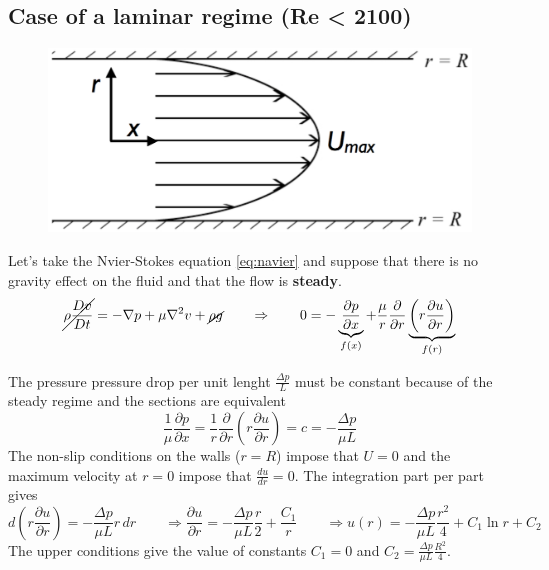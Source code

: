 	\subsection{Case of a laminar regime (Re < 2100)}
		\begin{figure}
		\vspace{-15mm}
		\includegraphics[scale=0.25]{ch2/6}
		\end{figure}
		Let's take the Nvier-Stokes equation \autoref{eq:navier} and suppose that there is no gravity effect on the fluid and that the flow is \textbf{steady}. 
		\begin{equation}
			\cancel{\rho \frac{Dv}{Dt}} = -\nabla p + \mu \nabla ^2 v + \cancel{\rho g} 
			\qquad \Rightarrow \qquad 
			0 = -\underbrace{\frac{\partial p}{\partial x}}_{f(x)} + \frac{\mu }{r} \frac{\partial}{\partial r} \underbrace{\left( r\frac{\partial u}{\partial r}\right)}_{f(r)}
		\end{equation}

		The pressure pressure drop per unit lenght $\frac{\Delta p}{L}$ must be constant because of the steady regime and the sections are equivalent
		\begin{equation}
			\frac{1}{\mu}\frac{\partial p}{\partial x} = \frac{1}{r} \frac{\partial}{\partial r} \left( r\frac{\partial u}{\partial r} \right) = c = - \frac{\Delta p}{\mu L}
		\end{equation}
		The non-slip conditions on the walls ($r=R$) impose that $U = 0$ and the maximum velocity at $r=0$ impose that $\frac{du}{dr} = 0$. The integration part per part gives
		\begin{equation}
			d \left( r\frac{\partial u}{\partial r} \right) = - \frac{\Delta p}{\mu L} r\, dr 
			\qquad \Rightarrow 
			\frac{\partial u}{\partial r} = -\frac{\Delta p}{\mu L} \frac{r}{2} + \frac{C_1}{r} 
			\qquad \Rightarrow 
			u(r) = -\frac{\Delta p}{\mu L} \frac{r^2}{4} + C_1 \ln r + C_2 
		\end{equation}
		The upper conditions give the value of constants $C_1 = 0$ and $C_2 = \frac{\Delta p}{\mu L}\frac{R^2}{4}$. \\
		
